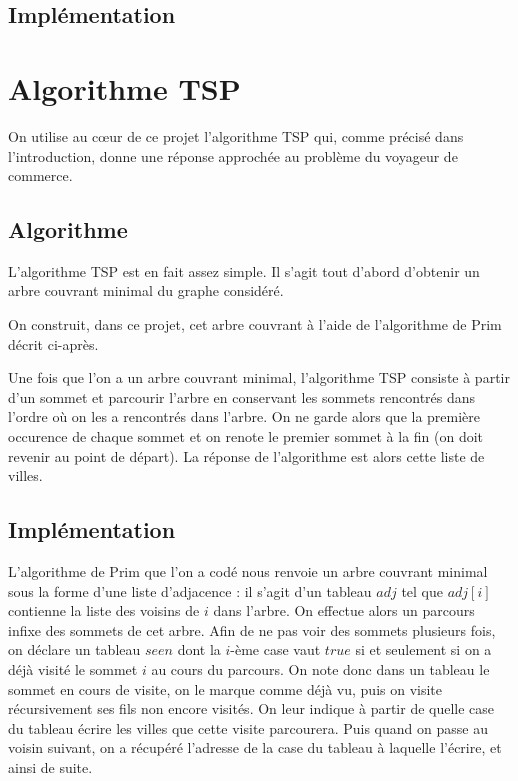 \documentclass{article}
\begin{document}
\subsection{Implémentation}

\section{Algorithme TSP}
On utilise au c\oe ur de ce projet l'algorithme TSP qui, comme précisé dans l'introduction, donne une réponse approchée au problème du voyageur de commerce.

\subsection{Algorithme}
L'algorithme TSP est en fait assez simple. Il s'agit tout d'abord d'obtenir un arbre couvrant minimal du graphe considéré.


On construit, dans ce projet, cet arbre couvrant à l'aide de l'algorithme de Prim décrit ci-après.

Une fois que l'on a un arbre couvrant minimal, l'algorithme TSP consiste à partir d'un sommet et parcourir l'arbre en conservant les sommets rencontrés dans l'ordre où 
on les a rencontrés dans l'arbre. On ne garde alors que la première occurence de chaque sommet et on renote le premier sommet à la fin (on doit revenir au point de 
départ). La réponse de l'algorithme est alors cette liste de villes.

\subsection{Implémentation}
L'algorithme de Prim que l'on a codé nous renvoie un arbre couvrant minimal sous la forme d'une liste d'adjacence : il s'agit d'un tableau $adj$ tel que
$adj[i]$ contienne la liste des voisins de $i$ dans l'arbre.
On effectue alors un parcours infixe
des sommets de cet arbre. Afin de ne pas voir des sommets plusieurs fois, on déclare un tableau $seen$ dont la $i$-ème case vaut $true$ si et seulement si on a déjà
visité le sommet $i$ au cours du parcours. On note donc dans un tableau le sommet en cours de visite, on le marque comme déjà vu, puis on visite récursivement ses 
fils non encore visités. On leur indique à partir de quelle case du tableau écrire les villes que cette visite parcourera. Puis quand on passe au voisin suivant, on a
récupéré l'adresse de la case du tableau à laquelle l'écrire, et ainsi de suite.
\end{document}
